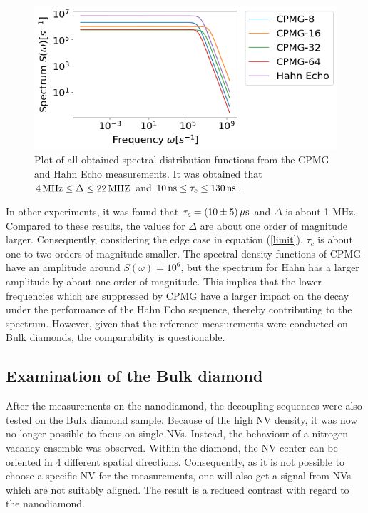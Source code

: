 \documentclass[12pt,a4paper]{article}
\begin{document}
\begin{figure}[H] 
\includegraphics[scale=0.6]{nd12.pdf} 
\caption{Plot of all obtained spectral distribution functions from the CPMG and Hahn Echo measurements. It was obtained that $\unit[4]{MHz}\leq\Delta\leq\unit[22]{MHZ}$ and $\unit[10]{ns}\leq\tau_c\leq \unit[130]{ns}$.}
\label{nd}
\end{figure}
In other experiments, it was found that $\tau_c=\unit[(10\pm5)]{\mu s}$ and $\Delta$ is about 1 MHz\cite{ssbd}. Compared to these results, the values for $\Delta$ are about one order of magnitude larger. Consequently, considering the edge case in equation (\ref{limit}), $\tau_c$ is about one to two orders of magnitude smaller. The spectral density functions of CPMG have an amplitude around $S(\omega)=10^6$, but the spectrum for Hahn has a larger amplitude by about one order of magnitude. This implies that the lower frequencies which are suppressed by CPMG have a larger impact on the decay under the performance of the Hahn Echo sequence, thereby contributing to the spectrum. However, given that the reference measurements were conducted on Bulk diamonds, the comparability is questionable.
 
\subsection{Examination of the Bulk diamond}
After the measurements on the nanodiamond, the decoupling sequences were also tested on the Bulk diamond sample. Because of the high NV density, it was now no longer possible to focus on single NVs. Instead, the behaviour of a nitrogen vacancy ensemble was observed. Within the diamond, the NV center can be oriented in 4 different spatial directions. Consequently, as it is not possible to choose a specific NV for the measurements, one will also get a signal from NVs which are not suitably aligned. The result is a reduced contrast with regard to the nanodiamond.\\
\end{document}
